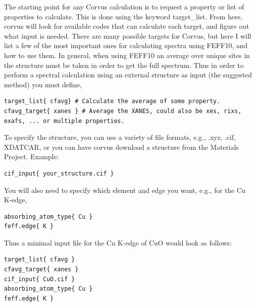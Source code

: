 The starting point for any Corvus calculation is to request a property or list of properties to calculate.
This is done using the keyword target\_list.
From here, corvus will look for available codes that can calculate each target, and figure out what input is needed.
There are many possible targets for Corvus, but here I will list a few of the most important ones for calculating spectra
using FEFF10, and how to use them. In general, when using FEFF10 an average over unique sites in the structure must be taken
in order to get the full spectrum. Thus in order to perform a spectral calculation using an external structure as input (the suggested method)
you must define,
\begin{verbatim}
target_list{ cfavg} # Calculate the average of some property.
cfavg_target{ xanes } # Average the XANES, could also be xes, rixs, exafs, ... or multiple properties.
\end{verbatim}

To specify the structure, you can use a variety of file formats, e.g., .xyz, .cif, XDATCAR, or you can have 
corvus download a structure from the Materials Project.
Example:
\begin{verbatim}
cif_input{ your_structure.cif }
\end{verbatim}

You will also need to specify which element and edge you want, e.g., for the Cu K-edge,
\begin{verbatim}
absorbing_atom_type{ Cu }
feff.edge{ K }
\end{verbatim}

Thus a minimal input file for the Cu K-edge of CuO would look as follows:
\begin{verbatim}
target_list{ cfavg }
cfavg_target{ xanes }
cif_input{ CuO.cif }
absorbing_atom_type{ Cu }
feff.edge{ K }
\end{verbatim}

